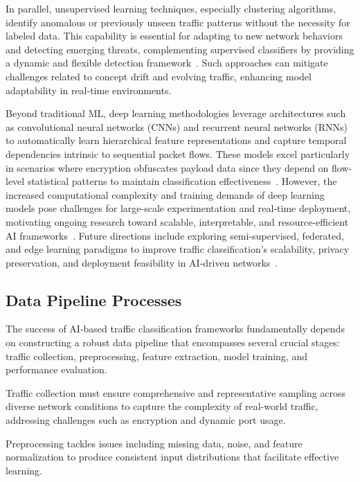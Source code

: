 \documentclass[sigconf]{acmart}
\begin{document}
In parallel, unsupervised learning techniques, especially clustering algorithms, identify anomalous or previously unseen traffic patterns without the necessity for labeled data. This capability is essential for adapting to new network behaviors and detecting emerging threats, complementing supervised classifiers by providing a dynamic and flexible detection framework~\cite{ref51}. Such approaches can mitigate challenges related to concept drift and evolving traffic, enhancing model adaptability in real-time environments.

Beyond traditional ML, deep learning methodologies leverage architectures such as convolutional neural networks (CNNs) and recurrent neural networks (RNNs) to automatically learn hierarchical feature representations and capture temporal dependencies intrinsic to sequential packet flows. These models excel particularly in scenarios where encryption obfuscates payload data since they depend on flow-level statistical patterns to maintain classification effectiveness~\cite{ref1,ref6,ref51}. However, the increased computational complexity and training demands of deep learning models pose challenges for large-scale experimentation and real-time deployment, motivating ongoing research toward scalable, interpretable, and resource-efficient AI frameworks~\cite{ref51}. Future directions include exploring semi-supervised, federated, and edge learning paradigms to improve traffic classification's scalability, privacy preservation, and deployment feasibility in AI-driven networks~\cite{ref51}.

\subsection{Data Pipeline Processes}

The success of AI-based traffic classification frameworks fundamentally depends on constructing a robust data pipeline that encompasses several crucial stages: traffic collection, preprocessing, feature extraction, model training, and performance evaluation.

Traffic collection must ensure comprehensive and representative sampling across diverse network conditions to capture the complexity of real-world traffic, addressing challenges such as encryption and dynamic port usage.

Preprocessing tackles issues including missing data, noise, and feature normalization to produce consistent input distributions that facilitate effective learning.
\end{document}
